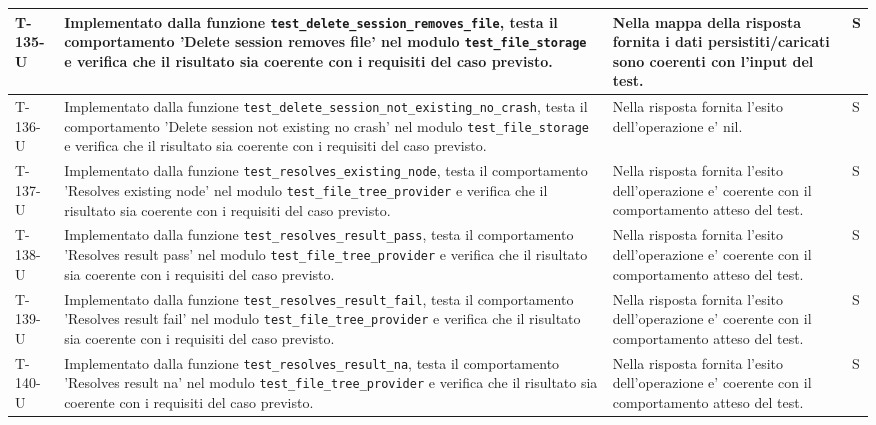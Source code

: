 \documentclass[a4paper,12pt]{article}
\begin{document}
{{\begin{longtable}{|>{\RaggedRight\arraybackslash}p{1.55cm}|>{\RaggedRight\arraybackslash}p{8.0cm}|>{\RaggedRight\arraybackslash}p{4.6cm}|>{\RaggedRight\arraybackslash}p{1.2cm}|}
        \hline
        T-135-U & Implementato dalla funzione \texttt{test\_\allowbreak delete\_\allowbreak session\_\allowbreak removes\_\allowbreak file}, testa il comportamento 'Delete session removes file' nel modulo \texttt{test\_\allowbreak file\_\allowbreak storage} e verifica che il risultato sia coerente con i requisiti del caso previsto. & Nella mappa della risposta fornita i dati persistiti/caricati sono coerenti con l'input del test. & S \\
        \hline
        T-136-U & Implementato dalla funzione \texttt{test\_\allowbreak delete\_\allowbreak session\_\allowbreak not\_\allowbreak existing\_\allowbreak no\_\allowbreak crash}, testa il comportamento 'Delete session not existing no crash' nel modulo \texttt{test\_\allowbreak file\_\allowbreak storage} e verifica che il risultato sia coerente con i requisiti del caso previsto. & Nella risposta fornita l'esito dell'operazione e' nil. & S \\
        \hline
        T-137-U & Implementato dalla funzione \texttt{test\_\allowbreak resolves\_\allowbreak existing\_\allowbreak node}, testa il comportamento 'Resolves existing node' nel modulo \texttt{test\_\allowbreak file\_\allowbreak tree\_\allowbreak provider} e verifica che il risultato sia coerente con i requisiti del caso previsto. & Nella risposta fornita l'esito dell'operazione e' coerente con il comportamento atteso del test. & S \\
        \hline
        T-138-U & Implementato dalla funzione \texttt{test\_\allowbreak resolves\_\allowbreak result\_\allowbreak pass}, testa il comportamento 'Resolves result pass' nel modulo \texttt{test\_\allowbreak file\_\allowbreak tree\_\allowbreak provider} e verifica che il risultato sia coerente con i requisiti del caso previsto. & Nella risposta fornita l'esito dell'operazione e' coerente con il comportamento atteso del test. & S \\
        \hline
        T-139-U & Implementato dalla funzione \texttt{test\_\allowbreak resolves\_\allowbreak result\_\allowbreak fail}, testa il comportamento 'Resolves result fail' nel modulo \texttt{test\_\allowbreak file\_\allowbreak tree\_\allowbreak provider} e verifica che il risultato sia coerente con i requisiti del caso previsto. & Nella risposta fornita l'esito dell'operazione e' coerente con il comportamento atteso del test. & S \\
        \hline
        T-140-U & Implementato dalla funzione \texttt{test\_\allowbreak resolves\_\allowbreak result\_\allowbreak na}, testa il comportamento 'Resolves result na' nel modulo \texttt{test\_\allowbreak file\_\allowbreak tree\_\allowbreak provider} e verifica che il risultato sia coerente con i requisiti del caso previsto. & Nella risposta fornita l'esito dell'operazione e' coerente con il comportamento atteso del test. & S \\

\end{longtable}}}
\end{document}
